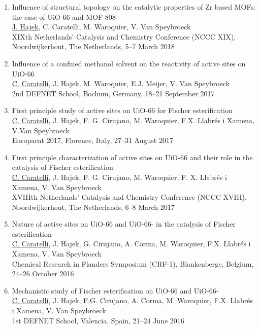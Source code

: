 \begin{enumerate}
\item
Influence of structural topology on the catalytic properties of Zr based MOFs: the case of UiO-66 and MOF-808\\
\underline{J. Hajek}, C. Caratelli, M. Waroquier, V. Van Speybroeck\\
XIXth Netherlands' Catalysis and Chemistry Conference (NCCC XIX),
Noordwijkerhout, The Netherlands, 5--7 March 2018

\item
Influence of a confined methanol solvent on the reactivity of active sites on UiO-66\\
\underline{C. Caratelli}, J. Hajek, M. Waroquier, E.J. Meijer, V. Van Speybroeck\\
2nd DEFNET School, Bochum, Germany, 18--21 September 2017

\item
First principle study of active sites on UiO-66 for Fischer esterification\\
\underline{C. Caratelli}, J. Hajek, F. G. Cirujano, M. Waroquier, F.X. Llabr\'es i Xamena, V.Van Speybroeck\\
Europacat 2017, Florence, Italy, 27--31 August 2017

\item
First principle characterization of active sites on UiO-66 and their role in the
catalysis of Fischer esterification\\
\underline{C. Caratelli}, J. Hajek, F. G. Cirujano, M. Waroquier, F. X. Llabr\'es i Xamena, V. Van Speybroeck \\
XVIIIth Netherlands' Catalysis and Chemistry Conference (NCCC XVIII),
Noordwijkerhout, The Netherlands, 6--8 March 2017

\item 
Nature of active sites on UiO-66 and
UiO-66- in the catalysis of Fischer esterification\\
\underline{C. Caratelli}, J. Hajek, G. Cirujano, A. Corma, M. Waroquier, F.X.
Llabr\'es i Xamena, V. Van Speybroeck\\
Chemical Research in Flanders Symposium (CRF-1), Blankenberge, Belgium, 24--26
October 2016

\item
Mechanistic study of Fischer esterification on UiO-66 and UiO-66-\\
\underline{C. Caratelli}, J. Hajek, F.G. Cirujano, A. Corma, M. Waroquier, F.X.
Llabr\'es i Xamena, V. Van Speybroeck\\
1st DEFNET School, Valencia, Spain, 21--24 June 2016
\end{enumerate}

